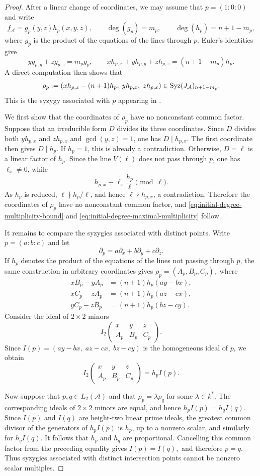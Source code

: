 \documentclass[11pt]{amsart}   %
\theoremstyle{definition}
\def\syz{\mbox{\rm Syz}}
\def\A{{\mathcal A}}
\begin{document}
\begin{proof}
After a linear change of coordinates, we may assume that $p=(1:0:0)$ and write
\[
f_\A=g_p(y,z)h_p(x,y,z), \qquad \deg(g_p)=m_p,\qquad \deg(h_p)=n+1-m_p,
\]
where $g_p$ is the product of the equations of the lines through $p$. Euler's identities give
\[
yg_{p,y}+zg_{p,z}=m_pg_p, \qquad xh_{p,x}+yh_{p,y}+zh_{p,z}=(n+1-m_p)h_p.
\]
A direct computation then shows that
\[
\rho_p
:= (xh_{p,x}-(n+1)h_p,\;yh_{p,x},\;zh_{p,x}) \in\syz(J_\A)_{n+1-m_p}.
\]
This is the syzygy associated with $p$ appearing in \cite[Theorem~1.2, formula~(2.4)]{Dimca-pencils}.

We first show that the coordinates of $\rho_p$ have no nonconstant common factor. Suppose that an irreducible form $D$ divides its three coordinates. Since $D$ divides both $yh_{p,x}$ and $zh_{p,x}$ and $\gcd(y,z)=1$, one has $D\mid h_{p,x}$. The first coordinate then gives $D\mid h_p$. If $h_p=1$, this is already a contradiction. Otherwise, $D=\ell$ is a linear factor of $h_p$. Since the line $V(\ell)$ does not pass through $p$, one has $\ell_x\neq0$, while
\[
h_{p,x} \equiv \ell_x\frac{h_p}{\ell} \pmod{\ell}.
\]
As $h_p$ is reduced, $\ell\nmid h_p/\ell$, and hence $\ell\nmid h_{p,x}$, a contradiction. Therefore the coordinates of $\rho_p$ have no nonconstant common factor, and \eqref{eq:initial-degree-multiplicity-bound} and \eqref{eq:initial-degree-maximal-multiplicity} follow.

It remains to compare the syzygies associated with distinct points. Write $p=(a:b:c)$ and let
\[
\partial_p
=
a\partial_x+b\partial_y+c\partial_z.
\]
If $h_p$ denotes the product of the equations of the lines not passing through $p$, the same construction in arbitrary coordinates gives $\rho_p=(A_p,B_p,C_p),$ where
\[
\begin{aligned}
xB_p-yA_p&=(n+1)h_p(ay-bx),\\
xC_p-zA_p&=(n+1)h_p(az-cx),\\
yC_p-zB_p&=(n+1)h_p(bz-cy).
\end{aligned}
\]
Consider the ideal of $2\times2$ minors
\[
I_2
\begin{pmatrix}
x&y&z\\ A_p&B_p&C_p
\end{pmatrix}.
\]
Since $I(p)=(ay-bx,\;az-cx,\;bz-cy)$ is the homogeneous ideal of $p$, we obtain
\[
I_2
\begin{pmatrix}
x&y&z\\ A_p&B_p&C_p
\end{pmatrix}
=
h_pI(p).
\]

Now suppose that $p,q\in L_2(\A)$ and that $\rho_p=\lambda\rho_q$ for some $\lambda\in k^*$. The corresponding ideals of $2\times2$ minors are equal, and hence $h_pI(p)=h_qI(q).$ Since $I(p)$ and $I(q)$ are height-two linear prime ideals, the greatest common divisor of the generators of $h_pI(p)$ is $h_p$, up to a nonzero scalar, and similarly for $h_qI(q)$. It follows that $h_p$ and $h_q$ are proportional. Cancelling this common factor from the preceding equality gives $I(p)=I(q),$ and therefore $p=q$. Thus syzygies associated with distinct intersection points cannot be nonzero scalar multiples.
\end{proof}
\end{document}
